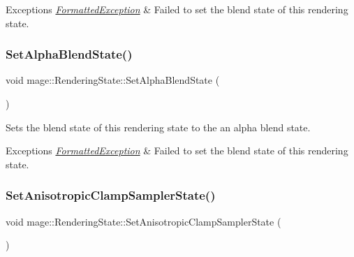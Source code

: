 \begin{DoxyExceptions}{Exceptions}
{\em \hyperlink{structmage_1_1_formatted_exception}{Formatted\+Exception}} & Failed to set the blend state of this rendering state. \\
\hline
\end{DoxyExceptions}
\hypertarget{structmage_1_1_rendering_state_a7f97752f22b0a32912f24d16c1aa2441}{}\label{structmage_1_1_rendering_state_a7f97752f22b0a32912f24d16c1aa2441} 
\subsubsection{\texorpdfstring{Set\+Alpha\+Blend\+State()}{SetAlphaBlendState()}}
{\footnotesize\ttfamily void mage\+::\+Rendering\+State\+::\+Set\+Alpha\+Blend\+State (\begin{DoxyParamCaption}{ }\end{DoxyParamCaption})}

Sets the blend state of this rendering state to the an alpha blend state.


\begin{DoxyExceptions}{Exceptions}
{\em \hyperlink{structmage_1_1_formatted_exception}{Formatted\+Exception}} & Failed to set the blend state of this rendering state. \\
\hline
\end{DoxyExceptions}
\hypertarget{structmage_1_1_rendering_state_a52b80c58015fb64f0b8afa7712807ccd}{}\label{structmage_1_1_rendering_state_a52b80c58015fb64f0b8afa7712807ccd} 
\subsubsection{\texorpdfstring{Set\+Anisotropic\+Clamp\+Sampler\+State()}{SetAnisotropicClampSamplerState()}}
{\footnotesize\ttfamily void mage\+::\+Rendering\+State\+::\+Set\+Anisotropic\+Clamp\+Sampler\+State (\begin{DoxyParamCaption}{ }\end{DoxyParamCaption})}

